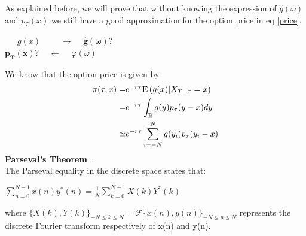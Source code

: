 \documentclass[12pt]{report}
\begin{document}
As explained before, we will prove that without knowing the expression of $\hat g (\omega)$ and $p_T(x)$ we still have a good approximation for the option price in eq \eqref{price}.

\begin{center}
 
~~~$g(x)$ ~~~~$\rightarrow$  ~  $ \mathbf{\hat g (\omega) ? }$\\
$\mathbf{{p_T}(x) ?}$ ~  $\leftarrow$ ~  $ \varphi (\omega)$
\end{center}

We know that the option price is given by 
\begin{align*}
\pi(\tau,x)= & e^{-r\tau} \mathrm{E} \left( {{g(x)|X_{T-\tau} = x}} \right)\\
\label{ff}
=& e^{-r\tau} \int_{\mathbb{R}}g(y)p_{\tau}(y-x)dy \\
\simeq  & e^{-r\tau} \sum_{i=-N}^{N}g(y_i)p_{\tau} (y_i-x)
\end{align*}
\textbf{Parseval's Theorem } : \\
The Parseval equality  in the discrete space states that: 
\begin{center}
\label{sum}
$\sum \limits_{n=0}^{N-1} x(n)y^*(n)= \frac{1}{N} \sum \limits_{k=0}^{N-1} X(k)Y^*(k)$
\end{center} 
where $\{X(k), Y(k)\}_{-N \leq k \leq N} = \mathcal{F} \{ x(n),y(n)\}_{-N \leq n \leq N} $ represents the discrete  Fourier transform respectively of x(n) and y(n).
\jcom{}\\
\end{document}
